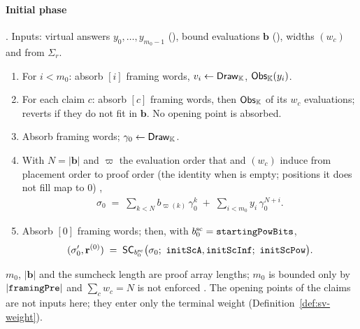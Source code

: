 \paragraph{Initial phase} . Inputs: virtual
answers $y_0,\dots,y_{m_0-1}$ (), bound evaluations
$\mathbf{b}$ (), widths $(w_c)$ and  from
$\Sigma_r$.
\begin{enumerate}
\item For $i<m_0$: absorb $[i]$ framing words,
  $v_i \gets \mathsf{Draw}_{\mathbb{K}}$, $\mathsf{Obs}_{\mathbb{K}}(y_i)$.
\item For each claim $c$: absorb $[c]$ framing words, then
  $\mathsf{Obs}_{\mathbb{K}}$ of its $w_c$ evaluations; reverts if they do not fit in
  $\mathbf{b}$. No opening point is absorbed.
\item Absorb  framing words; $\gamma_0 \gets \mathsf{Draw}_{\mathbb{K}}$.
\item With $N = |\mathbf{b}|$ and $\varpi$ the evaluation order that
   and $(w_c)$ induce from placement order to proof order (the
  identity when  is empty; positions it does not fill map to $0$)
  ,
  \begin{align}
    \sigma_0 \;=\; \sum_{k<N} b_{\varpi(k)}\,\gamma_0^{k} \;+\; \sum_{i<m_0} y_i\,\gamma_0^{N+i}.
  \end{align}
\item Absorb $[0]$ framing words; then, with
  $b^{\mathrm{sc}}_0 = \texttt{startingPowBits}$,
  \begin{align}
    (\sigma_0', \mathbf{r}^{(0)}) \;=\; \mathsf{SC}_{b^{\mathrm{sc}}_0}\big(\sigma_0;\
    \texttt{initScA},\texttt{initScInf};\ \texttt{initScPow}\big).
  \end{align}
\end{enumerate}
$m_0$, $|\mathbf{b}|$ and the sumcheck length are proof array lengths;
$m_0$ is bounded only by $|\texttt{framingPre}|$ and $\sum_c w_c = N$ is not
enforced \finding{M-05}. The opening points of the claims are not inputs here;
they enter only the terminal weight (Definition~\ref{def:sv-weight}).

